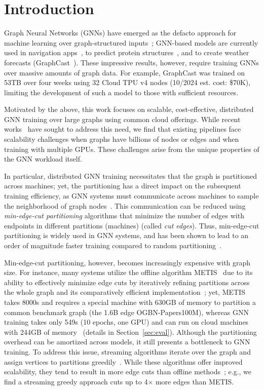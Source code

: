\section{Introduction}
Graph Neural Networks (GNNs) have emerged as the defacto approach for machine learning over graph-structured inputs~\cite{chami2021machine}; GNN-based models are currently used in navigation apps~\cite{derrow2021eta}, to predict protein structures~\cite{jumper2021highly}, and to create weather forecasts (GraphCast~\cite{lam2022graphcast}). These impressive results, however, require training GNNs over massive amounts of graph data. For example, GraphCast was trained on 53TB over four weeks using 32 Cloud TPU v4 nodes (10/2024 est. cost: \$70K), limiting the development of such a model to those with sufficient resources. 

Motivated by the above, this work focuses on scalable, cost-effective, distributed GNN training over large graphs using common cloud offerings. While recent works~\cite{salient++, distDGL, distdglv2} have sought to address this need, we find that existing pipelines face scalability challenges when graphs have billions of nodes or edges and when training with multiple GPUs. These challenges arise from the unique properties of the GNN workload itself.

In particular, distributed GNN training necessitates that the graph is partitioned across machines; yet, the partitioning has a direct impact on the subsequent training efficiency, as GNN systems must communicate across machines to sample the neighborhood of graph nodes~\cite{shao2024distributed}. This communication can be reduced using \textit{min-edge-cut partitioning} algorithms that minimize the number of edges with endpoints in different partitions (machines) (called \textit{cut edges}). Thus, min-edge-cut partitioning is widely used in GNN systems, and has been shown to lead to an order of magnitude faster training compared to random partitioning~\cite{merkel2023experimental, distdglv2}. 

Min-edge-cut partitioning, however, becomes increasingly expensive with graph size. For instance, many systems utilize the offline algorithm METIS~\cite{karypis1997metis} due to its ability to effectively minimize edge cuts by iteratively refining partitions across the whole graph and its comparatively efficient implementation~\cite{merkel2023experimental, shao2024distributed, lin2023comprehensive}; yet, METIS takes 8000s and requires a special machine with 630GB of memory to partition a common benchmark graph (the 1.6B edge OGBN-Papers100M), whereas GNN training takes only 549s (10 epochs, one GPU) and can run on cloud machines with 244GB of memory~\cite{mariusgnn} (details in Section~\ref{sec:eval}). Although the partitioning overhead can be amortized across models, it still presents a bottleneck to GNN training. To address this issue, streaming algorithms iterate over the graph and assign vertices to partitions greedily~\cite{abbas2018streaming}. While these algorithms offer improved scalability, they tend to result in more edge cuts than offline methods~\cite{zhang2018akin}; e.g., we find a streaming greedy approach cuts up to 4$\times$ more edges than METIS.


